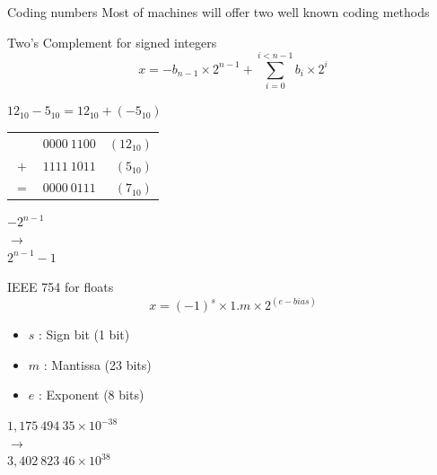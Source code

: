 \documentclass{beamer}
\begin{document}
\begin{frame}{Coding numbers}
  Most of machines will offer two well known coding methods
  \begin{minipage}{0.45\textwidth}
  \begin{block}{Two’s Complement for signed integers}\small
    $$x = - b_{n-1}\times 2^{n-1} + \sum_{i = 0}^{i<n-1} b_i \times 2^i$$
    \centering

    $12_{10} - 5_{10} = 12_{10} + (-5_{10})$
    
    \begin{tabular}{c l r}
     & $0000~1100$ & $(12_{10})$\\
     $+$ & $1111~1011$ & $(5_{10})$\\\hline
     $=$ & $0000~0111$ & $(7_{10})$
    \end{tabular}
    
    \medskip
    $-2^{n-1}$\\$\rightarrow$\\$2^{n-1}-1$
  \end{block}
  \end{minipage}\hfill\begin{minipage}{0.45\textwidth}
  \begin{block}{IEEE 754 for floats}\small
    $$x = (-1)^s \times 1.m \times 2^{(e - bias)}$$
    \begin{itemize}
      \item $s$ : Sign bit (1 bit)
      \item $m$ : Mantissa (23 bits)
      \item $e$ : Exponent (8 bits)
    \end{itemize}
    
    \medskip
    \centering
    $1,175~494~35 \times 10^{−38}$\\$\rightarrow$\\$3,402~823~46 \times 10^{38}$
  \end{block}
  \end{minipage}
\end{frame}
\end{document}
